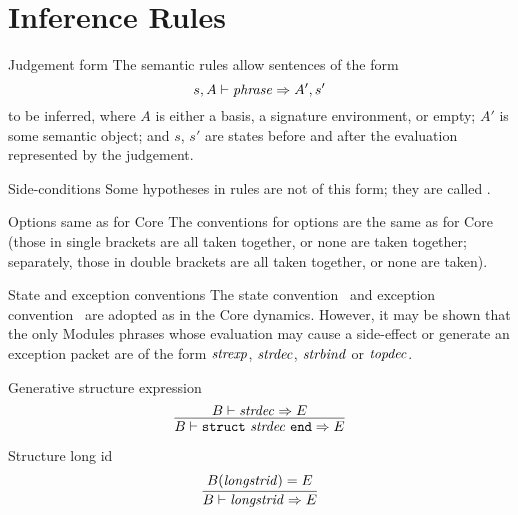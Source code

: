 \section{Inference Rules}

\begin{definition}{Judgement form}
The semantic rules allow sentences  of the form
\begin{equation*}
s,A\vdash\textit{phrase\/}\Rightarrow A',s'
\end{equation*}
to be inferred, where $A$ is either a basis, a signature environment, or
empty; $A'$ is some semantic object; and $s$, $s'$ are states before and
after the evaluation represented by the judgement.
\end{definition}

\begin{definition}{Side-conditions}
Some hypotheses in rules are not of this form; they are called
.
\end{definition}

\begin{convention}{Options same as for Core}
The conventions for options are the same as for Core (those in single
brackets are all taken together, or none are taken together; separately,
those in double brackets are all taken together, or none are taken).
\end{convention}

\begin{convention}{State and exception conventions}
The state convention~ and
exception convention~ are
adopted as in the Core dynamics. However, it may be shown that the only
Modules phrases whose evaluation may cause a side-effect or generate an
exception packet are of the form $\textit{strexp\/}$, $\textit{strdec\/}$, $\textit{strbind\/}$ or
$\textit{topdec\/}$.
\end{convention}


\begin{inference-rule}{Generative structure expression}
\begin{equation}\label{rule:dynamic-modules:generative-structure-expression}
\vcenter{\infer{\B\ts\encstrexp\ra\E}
  {\B\ts\strdec\ra\E}}
\end{equation}
\end{inference-rule}

\begin{inference-rule}{Structure long id}
\begin{equation}\label{rule:dynamic-modules:longstrid}
\vcenter{\infer{\B\ts\longstrid\ra\E}
  {\B(\longstrid)=\E}}
\end{equation}
\end{inference-rule}

